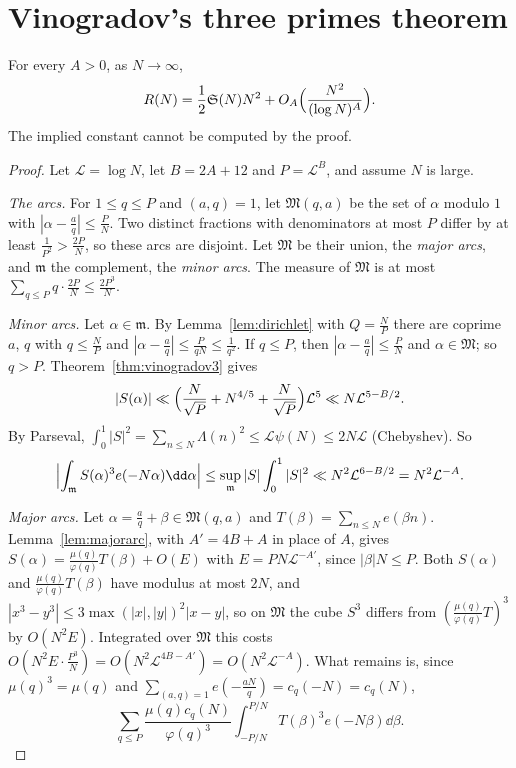 \section{Vinogradov's three primes theorem}

\begin{theorem}[Vinogradov, 1937]\label{thm:threeprimes}
For every $A>0$, as $N\to\infty$,
\[
R(N)=\frac12\mathfrak S(N)N^2+O_A\Bigl(\frac{N^2}{(\log N)^A}\Bigr).
\]
The implied constant cannot be computed by the proof.
\end{theorem}

\begin{proof}
Let $\mathcal L=\log N$, let $B=2A+12$ and $P=\mathcal L^B$, and assume $N$ is large.

\emph{The arcs.} For $1\le q\le P$ and $(a,q)=1$, let $\mathfrak M(q,a)$ be the set of $\alpha$ modulo $1$ with $|\alpha-\frac aq|\le\frac PN$. Two distinct fractions with denominators at most $P$ differ by at least $\frac1{P^2}>\frac{2P}N$, so these arcs are disjoint. Let $\mathfrak M$ be their union, the \emph{major arcs}, and $\mathfrak m$ the complement, the \emph{minor arcs}. The measure of $\mathfrak M$ is at most $\sum_{q\le P}q\cdot\frac{2P}N\le\frac{2P^3}N$.

\emph{Minor arcs.} Let $\alpha\in\mathfrak m$. By Lemma~\ref{lem:dirichlet} with $Q=\frac NP$ there are coprime $a$, $q$ with $q\le\frac NP$ and $|\alpha-\frac aq|\le\frac P{qN}\le\frac1{q^2}$. If $q\le P$, then $|\alpha-\frac aq|\le\frac PN$ and $\alpha\in\mathfrak M$; so $q>P$. Theorem~\ref{thm:vinogradov3} gives
\[
|S(\alpha)|\ll\Bigl(\frac N{\sqrt P}+N^{4/5}+\frac N{\sqrt P}\Bigr)\mathcal L^5\ll N\mathcal L^{5-B/2}.
\]
By Parseval, $\int_0^1|S|^2=\sum_{n\le N}\Lambda(n)^2\le\mathcal L\psi(N)\le2N\mathcal L$ (Chebyshev). So
\[
\Bigl|\int_{\mathfrak m}S(\alpha)^3e(-N\alpha)\dd\alpha\Bigr|\le\sup_{\mathfrak m}|S|\int_0^1|S|^2\ll N^2\mathcal L^{6-B/2}=N^2\mathcal L^{-A}.
\]

\emph{Major arcs.} Let $\alpha=\frac aq+\beta\in\mathfrak M(q,a)$ and $T(\beta)=\sum_{n\le N}e(\beta n)$. Lemma~\ref{lem:majorarc}, with $A'=4B+A$ in place of $A$, gives $S(\alpha)=\frac{\mu(q)}{\varphi(q)}T(\beta)+O(E)$ with $E=PN\mathcal L^{-A'}$, since $|\beta|N\le P$. Both $S(\alpha)$ and $\frac{\mu(q)}{\varphi(q)}T(\beta)$ have modulus at most $2N$, and $|x^3-y^3|\le3\max(|x|,|y|)^2|x-y|$, so on $\mathfrak M$ the cube $S^3$ differs from $(\frac{\mu(q)}{\varphi(q)}T)^3$ by $O(N^2E)$. Integrated over $\mathfrak M$ this costs $O(N^2E\cdot\frac{P^3}N)=O(N^2\mathcal L^{4B-A'})=O(N^2\mathcal L^{-A})$. What remains is, since $\mu(q)^3=\mu(q)$ and $\sum_{(a,q)=1}e(-\frac{aN}q)=c_q(-N)=c_q(N)$,
\[
\sum_{q\le P}\frac{\mu(q)c_q(N)}{\varphi(q)^3}\int_{-P/N}^{P/N}T(\beta)^3e(-N\beta)\dd\beta.
\]


\end{proof}

